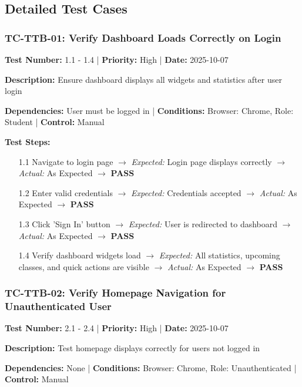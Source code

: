 \subsection{Detailed Test Cases}

\subsubsection{TC-TTB-01: Verify Dashboard Loads Correctly on Login}

\textbf{Test Number:} 1.1 - 1.4 | \textbf{Priority:} High | \textbf{Date:} 2025-10-07

\textbf{Description:} Ensure dashboard displays all widgets and statistics after user login

\textbf{Dependencies:} User must be logged in | \textbf{Conditions:} Browser: Chrome, Role: Student | \textbf{Control:} Manual

\textbf{Test Steps:}
\begin{enumerate}[leftmargin=*]
    \item[1.1] Navigate to login page $\rightarrow$ \textit{Expected:} Login page displays correctly $\rightarrow$ \textit{Actual:} As Expected $\rightarrow$ \textbf{PASS}
    \item[1.2] Enter valid credentials $\rightarrow$ \textit{Expected:} Credentials accepted $\rightarrow$ \textit{Actual:} As Expected $\rightarrow$ \textbf{PASS}
    \item[1.3] Click 'Sign In' button $\rightarrow$ \textit{Expected:} User is redirected to dashboard $\rightarrow$ \textit{Actual:} As Expected $\rightarrow$ \textbf{PASS}
    \item[1.4] Verify dashboard widgets load $\rightarrow$ \textit{Expected:} All statistics, upcoming classes, and quick actions are visible $\rightarrow$ \textit{Actual:} As Expected $\rightarrow$ \textbf{PASS}
\end{enumerate}

\subsubsection{TC-TTB-02: Verify Homepage Navigation for Unauthenticated User}

\textbf{Test Number:} 2.1 - 2.4 | \textbf{Priority:} High | \textbf{Date:} 2025-10-07

\textbf{Description:} Test homepage displays correctly for users not logged in

\textbf{Dependencies:} None | \textbf{Conditions:} Browser: Chrome, Role: Unauthenticated | \textbf{Control:} Manual

